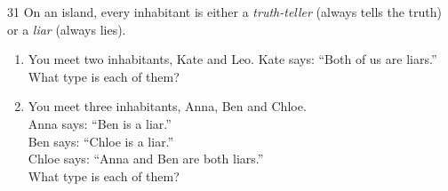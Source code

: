 \clearpage
{}

\begin{probbox}{31}{\relax}
On an island, every inhabitant is either a \emph{truth-teller} (always tells the truth) or a \emph{liar} (always lies).
\begin{enumerate}[label=\alph*),leftmargin=1.6em,itemsep=1pt,topsep=2pt]
  \item You meet two inhabitants, Kate and Leo. Kate says: ``Both of us are liars.'' What type is each of them?
  \item You meet three inhabitants, Anna, Ben and Chloe.\\
  Anna says: ``Ben is a liar.''\\
  Ben says: ``Chloe is a liar.''\\
  Chloe says: ``Anna and Ben are both liars.''\\
  What type is each of them?
\end{enumerate}
\end{probbox}
